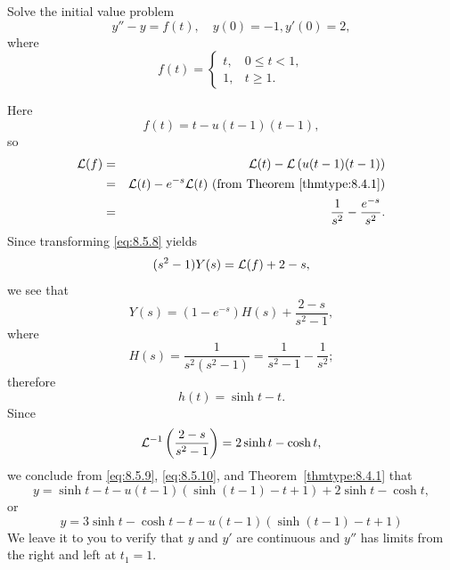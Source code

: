 \documentclass{ximera}
\begin{document}
\begin{example}\label{example:8.5.3}
Solve the initial value problem
\begin{equation}\label{eq:8.5.8}
y''-y=f(t), \quad   y(0)=-1,  y'(0)=2,
\end{equation}
where
$$
f(t)=\left\{\begin{array}{cl}
t,&0\leq t<1,\\
1,&t\geq 1.
\end{array}\right.
$$
\begin{explanation}
Here
$$
f(t)=t-u(t-1)(t-1),
$$
so
\begin{eqnarray*}
{\cal L}(f)&=&{\cal L}(t)-{\cal L}\left(u(t-1)(t-1)\right)\\
&=&{\cal L}(t)-e^{-s}{\cal L}(t)\mbox{ (from
Theorem~\ref{thmtype:8.4.1})}\\
&=&\frac{1}{s^2}-\frac{e^{-s}}{s^2}.
\end{eqnarray*}
Since transforming  \eqref{eq:8.5.8} yields
$$
(s^2-1) Y(s)={\cal L}(f)+2-s,
$$
we see that
\begin{equation}\label{eq:8.5.9}
Y(s)=(1-e^{-s})H(s)+\frac{2-s}{s^2-1},
\end{equation}
where
$$
H(s)=\frac{1}{s^2(s^2-1)}=\frac{1}{s^2-1}-\frac{1}{s^2};
$$
 therefore
\begin{equation}\label{eq:8.5.10}
h(t)=\sinh t-t.
\end{equation}
Since
$$
{\cal L}^{-1}\left(\frac{2-s}{s^2-1}\right)=2\sinh t-\cosh t,
$$
we conclude from  \eqref{eq:8.5.9},  \eqref{eq:8.5.10}, and
Theorem~\ref{thmtype:8.4.1} that
$$
y=\sinh t-t-u(t-1)\left(\sinh (t-1)-t+1\right)+2\sinh t-
\cosh t,
$$
or
\begin{equation}\label{eq:8.5.11}
y=3\sinh t-\cosh t-t-u(t-1)\left(\sinh (t-1)-t+1\right)
\end{equation}
We leave it to you to verify that $y$  and $y'$ are continuous and
$y''$ has limits from the right and left at
$t_1=1$.
\end{explanation}
\end{example}
\end{document}
